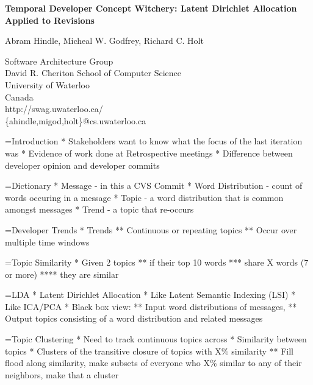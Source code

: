 \documentclass[titlepage,usenames,a4,landscape,semhelv,16pt]{seminar}
\author{
\names \\ 
{\small Software Architecture Group }\\
\small David R. Cheriton School of Computer Science\\
\small University of Waterloo\\
\small Canada\\
ahindle@cs.uwaterloo.ca
}
\newcommand{\gettitle}{Temporal Developer Concept Witchery: Latent Dirichlet Allocation Applied to Revisions}
\newcommand{\gettitleproper}{\gettitle}
\newcommand{\names}{Abram Hindle, Micheal W. Godfrey, Richard C. Holt}
\begin{document}
\pagestyle{fancy} %
\begin{slide}

\begin{center}
{\bf \LARGE \gettitleproper }

{\names } 

{\small Software Architecture Group }\\[-.5em]
{\small David R. Cheriton School of Computer Science}\\[-.5em]
{\small University of Waterloo}\\[-.5em]
{\small Canada}\\[-.5em]
{\small http://swag.uwaterloo.ca/}\\
\{ahindle,migod,holt\}@cs.uwaterloo.ca


\end{center}

=Introduction
* Stakeholders want to know what the focus of the last iteration was
* Evidence of work done at Retrospective meetings
* Difference between developer opinion and developer commits


=Dictionary
* Message - in this a CVS Commit
* Word Distribution - count of words occuring in a message
* Topic - a word distribution that is common amongst messages
* Trend - a topic that re-occurs

\newslide
{}

=Developer Trends
* Trends
** Continuous or repeating topics
** Occur over multiple time windows

=Topic Similarity
* Given 2 topics
** if their top 10 words 
*** share X words (7 or more)
****  they are similar

=LDA
* Latent Dirichlet Allocation
* Like Latent Semantic Indexing (LSI)
* Like ICA/PCA
* Black box view:
** Input word distributions of messages, 
** Output topics consisting of a word distribution and related messages

=Topic Clustering 
* Need to track continuous topics across 
* Similarity between topics
* Clusters of the transitive closure of topics with X\% similarity
** Fill flood along similarity, make subsets of everyone who X\% similar to any of their neighbors, make that a cluster

\newslide




\end{slide}
\end{document}
